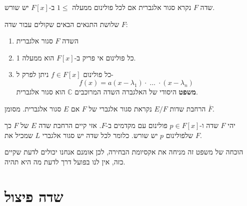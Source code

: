 \documentclass{tstextbook}
\begin{document}
\begin{definition}
שדה \(F\) נקרא סגור אלגברית אם לכל פולינום ממעלה \(1\leq\) ב-\(F[x]\) יש שורש.

\end{definition}
\begin{proposition}
שלושת התנאים הבאים שקולים עבור שדה \(F\):

  \begin{enumerate}
    \item השדה \(F\) סגור אלגברית 


    \item כל פולינום אי פריק ב-\(F[x]\) הוא ממעלה 1. 


    \item כל פולינום \(f \in F[x]\) ניתן לפרק ל- 
$$f(x)=a\left( x-\lambda_{1} \right)\cdot\;\!\dots\;\!\cdot\left( x-\lambda_{n} \right)$$\textbf{משפט} היסודי של האלגברה
השדה המרוכבים \(\mathbb{C}\) הוא סגור אלגברית.


  \end{enumerate}
\end{proposition}
\begin{definition}
הרחבת שדות \(E / F\) נקראת סגור אלגברי של \(F\) אם \(E\) סגור אלגברית. מסומן \(\overline{F}\).

\end{definition}
\begin{theorem}
יהי \(F\) שדה ו-\(p \in F[x]\) פולינום עם מקדמים ב-\(F\). אזי קיים הרחבת שדה \(E\) של \(F\) כך שלפולינום \(p\) יש שורש. כלומר לכל שדה יש סגור אלגברי \(L\) שמכיל את \(F\).

\end{theorem}
\begin{remark}
הוכחה של משפט זה מניחה את אקסיומת הבחירה, לכן אומנם אנחנו יכולים לדעת שקיים כזה, אין לנו בפועל דרך לדעת מה היא תהיה.

\end{remark}

\section{שדה פיצול}
\end{document}
